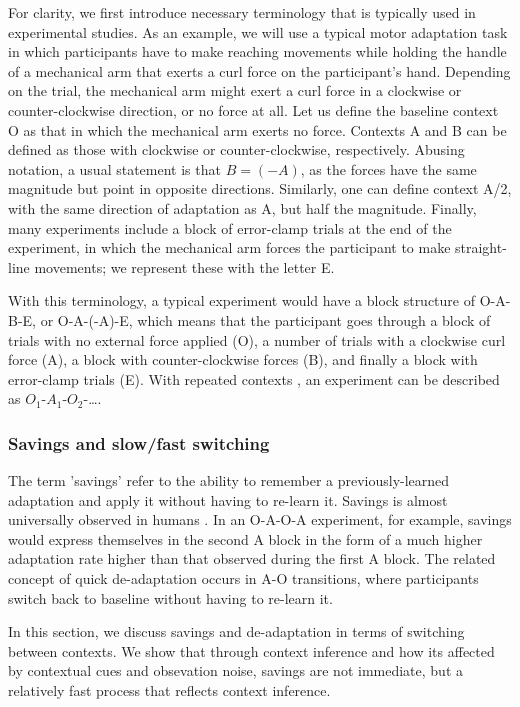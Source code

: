 \documentclass[a4paper,doc,floatsintext,natbib]{apa6}%
\begin{document}
For clarity, we first introduce necessary terminology that is typically used in experimental studies. As an example, we will use a typical motor adaptation task in which participants have to make reaching movements while holding the handle of a mechanical arm that exerts a curl force on the participant's hand. Depending on the trial, the mechanical arm might exert a curl force in a clockwise or counter-clockwise direction, or no force at all. Let us define the baseline context O as that in which the mechanical arm exerts no force. Contexts A and B can be defined as those with clockwise or counter-clockwise, respectively. Abusing notation, a usual statement is that $B = (-A)$, as the forces have the same magnitude but point in opposite directions. Similarly, one can define context A/2, with the same direction of adaptation as A, but half the magnitude. Finally, many experiments include a block of error-clamp trials at the end of the experiment, in which the mechanical arm forces the participant to make straight-line movements; we represent these with the letter E.

With this terminology, a typical experiment \cite[e.g.][]{Ethier_Spontaneous_2008} would have a block structure of O-A-B-E, or O-A-(-A)-E, which means that the participant goes through a block of trials with no external force applied (O), a number of trials with a clockwise curl force (A), a block with counter-clockwise forces (B), and finally a block with error-clamp trials (E). With repeated contexts \citep[e.g.][]{Oh_Minimizing_2019}, an experiment can be described as $O_1$-$A_1$-$O_2$-\ldots .

\subsubsection{Savings and slow/fast switching}
The term 'savings' refer to the ability to remember a previously-learned adaptation and apply it without having to re-learn it. Savings is almost universally observed in humans \citep{Brashers-Krug_Consolidation_1996,Shadmehr_Functional_1997,Medina_Mechanism_2001,Smith_Interacting_2006,Zarahn_Explaining_2008}. In an O-A-O-A experiment, for example, savings would express themselves in the second A block in the form of a much higher adaptation rate higher than that observed during the first A block. The related concept of quick de-adaptation occurs in A-O transitions, where participants switch back to baseline without having to re-learn it.

In this section, we discuss savings and de-adaptation in terms of switching between contexts. We show that through context inference and how its affected by contextual cues and obsevation noise, savings are not immediate, but a relatively fast process that reflects context inference.
\end{document}
